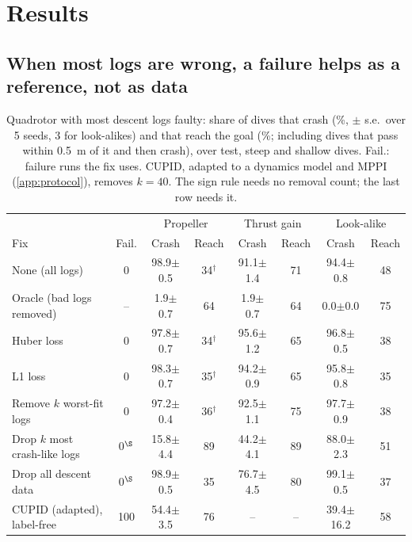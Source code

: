 \documentclass[preprint,12pt]{elsarticle}
\newcommand{\pmse}[2]{#1{\scriptsize$\pm$#2}}
\begin{document}
\section{Results}\label{sec:results}

\subsection{When most logs are wrong, a failure helps as a reference, not as data}\label{sec:main}

\begin{table}[t]
\caption{Quadrotor with most descent logs faulty: share of dives that crash (\%, $\pm$ s.e.\ over 5 seeds, 3 for look-alikes) and that reach the goal (\%; including dives that pass within 0.5~m of it and then crash), over test, steep and shallow dives. Fail.: failure runs the fix uses. CUPID, adapted to a dynamics model and MPPI (\ref{app:protocol}), removes $k=40$. The sign rule needs no removal count; the last row needs it.}
\label{tab:major}
\centering\footnotesize
\setlength{\tabcolsep}{3pt}
\begin{tabular}{@{}lccccccc@{}}
\toprule
 & & \multicolumn{2}{c}{Propeller} & \multicolumn{2}{c}{Thrust gain} & \multicolumn{2}{c}{Look-alike} \\
Fix & Fail. & Crash & Reach & Crash & Reach & Crash & Reach \\
\midrule
None (all logs) & 0 & \pmse{98.9}{0.5} & 34$^\dagger$ & \pmse{91.1}{1.4} & 71 & \pmse{94.4}{0.8} & 48 \\
Oracle (bad logs removed) & -- & \pmse{1.9}{0.7} & 64 & \pmse{1.9}{0.7} & 64 & \pmse{0.0}{0.0} & 75 \\
\midrule
Huber loss & 0 & \pmse{97.8}{0.7} & 34$^\dagger$ & \pmse{95.6}{1.2} & 65 & \pmse{96.8}{0.5} & 38 \\
L1 loss & 0 & \pmse{98.3}{0.7} & 35$^\dagger$ & \pmse{94.2}{0.9} & 65 & \pmse{95.8}{0.8} & 35 \\
Remove $k$ worst-fit logs & 0 & \pmse{97.2}{0.4} & 36$^\dagger$ & \pmse{92.5}{1.1} & 75 & \pmse{97.7}{0.9} & 38 \\
\midrule
Drop $k$ most crash-like logs & 0$^\S$ & \pmse{15.8}{4.4} & 89 & \pmse{44.2}{4.1} & 89 & \pmse{88.0}{2.3} & 51 \\
Drop all descent data & 0$^\S$ & \pmse{98.9}{0.5} & 35 & \pmse{76.7}{4.5} & 80 & \pmse{99.1}{0.5} & 37 \\
CUPID (adapted), label-free & 100 & \pmse{54.4}{3.5} & 76 & -- & -- & \pmse{39.4}{16.2} & 58 \\

\end{tabular}
\end{table}
\end{document}
